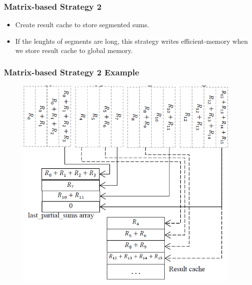 \begin{frame}
	\frametitle{Matrix-based Strategy 2}
	\begin{itemize}
		\item Create result cache to store segmented sums.
		\item If the lenghts of segments are long, this strategy
			writes efficient-memory when we store result cache to
			global memory.
	\end{itemize}
\end{frame}
\begin{frame}
	\frametitle{Matrix-based Strategy 2 Example}
	\begin{figure}
		\includegraphics[scale=0.3]{figure/fig3-strategy2.png}
	\end{figure}
\end{frame}